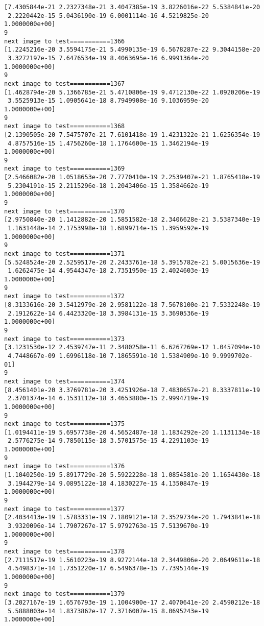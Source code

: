\documentclass[11pt]{article}
\begin{document}
\begin{Verbatim}[commandchars=\\\{\}]
[7.4305844e-21 2.2327348e-21 3.4047385e-19 3.8226016e-22 5.5384841e-20
 2.2220442e-15 5.0436190e-19 6.0001114e-16 4.5219825e-20 1.0000000e+00]
9
next image to test===========1366
[1.2245216e-20 3.5594175e-21 5.4990135e-19 6.5678287e-22 9.3044158e-20
 3.3272197e-15 7.6476534e-19 8.4063695e-16 6.9991364e-20 1.0000000e+00]
9
next image to test===========1367
[1.4628794e-20 5.1366785e-21 5.4710806e-19 9.4712130e-22 1.0920206e-19
 3.5525913e-15 1.0905641e-18 8.7949908e-16 9.1036959e-20 1.0000000e+00]
9
next image to test===========1368
[2.1390505e-20 7.5475707e-21 7.6101418e-19 1.4231322e-21 1.6256354e-19
 4.8757516e-15 1.4756260e-18 1.1764600e-15 1.3462194e-19 1.0000000e+00]
9
next image to test===========1369
[2.5466082e-20 1.0518653e-20 7.7770410e-19 2.2539407e-21 1.8765418e-19
 5.2304191e-15 2.2115296e-18 1.2043406e-15 1.3584662e-19 1.0000000e+00]
9
next image to test===========1370
[2.9750840e-20 1.1412882e-20 1.5851582e-18 2.3406628e-21 3.5387340e-19
 1.1631448e-14 2.1753998e-18 1.6899714e-15 1.3959592e-19 1.0000000e+00]
9
next image to test===========1371
[5.5248524e-20 2.5259517e-20 2.2433761e-18 5.3915782e-21 5.0015636e-19
 1.6262475e-14 4.9544347e-18 2.7351950e-15 2.4024603e-19 1.0000000e+00]
9
next image to test===========1372
[8.3133616e-20 3.5412979e-20 2.9581122e-18 7.5678100e-21 7.5332248e-19
 2.1912622e-14 6.4423320e-18 3.3984131e-15 3.3690536e-19 1.0000000e+00]
9
next image to test===========1373
[3.1231530e-12 2.4539747e-11 2.3480258e-11 6.6267269e-12 1.0457094e-10
 4.7448667e-09 1.6996118e-10 7.1865591e-10 1.5384909e-10 9.9999702e-01]
9
next image to test===========1374
[8.4561401e-20 3.3769781e-20 3.4251926e-18 7.4838657e-21 8.3337811e-19
 2.3701374e-14 6.1531112e-18 3.4653880e-15 2.9994719e-19 1.0000000e+00]
9
next image to test===========1375
[1.0194411e-19 5.6957738e-20 4.5652487e-18 1.1834292e-20 1.1131134e-18
 2.5776275e-14 9.7850115e-18 3.5701575e-15 4.2291103e-19 1.0000000e+00]
9
next image to test===========1376
[1.1040250e-19 5.8917729e-20 5.5922228e-18 1.0854581e-20 1.1654430e-18
 3.1944279e-14 9.0895122e-18 4.1830227e-15 4.1350847e-19 1.0000000e+00]
9
next image to test===========1377
[2.4034413e-19 1.5783331e-19 7.1809121e-18 2.3529734e-20 1.7943841e-18
 3.9320096e-14 1.7907267e-17 5.9792763e-15 7.5139670e-19 1.0000000e+00]
9
next image to test===========1378
[2.7111517e-19 1.5610223e-19 8.9272144e-18 2.3449806e-20 2.0649611e-18
 4.5498371e-14 1.7351220e-17 6.5496378e-15 7.7395144e-19 1.0000000e+00]
9
next image to test===========1379
[3.2027167e-19 1.6576793e-19 1.1004900e-17 2.4070641e-20 2.4590212e-18
 5.5888003e-14 1.8373862e-17 7.3716007e-15 8.0695243e-19 1.0000000e+00]

\end{Verbatim}
\end{document}
